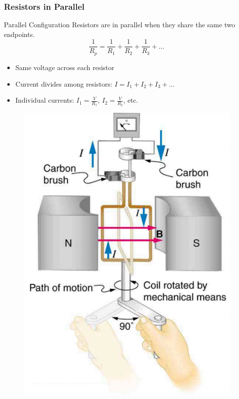 \documentclass{beamer}
\begin{document}
\begin{frame}
    \frametitle{Resistors in Parallel}
    \begin{block}{Parallel Configuration}
        Resistors are in parallel when they share the same two endpoints.
        \[ \frac{1}{R_p} = \frac{1}{R_1} + \frac{1}{R_2} + \frac{1}{R_3} + \ldots \]
    \end{block}
    \begin{itemize}
        \item Same voltage across each resistor
        \item Current divides among resistors: $I = I_1 + I_2 + I_3 + \ldots$
        \item Individual currents: $I_1 = \frac{V}{R_1}$, $I_2 = \frac{V}{R_2}$, etc.
    \end{itemize}
    \begin{center}
        \begin{figure}
            \centering
            \includegraphics[width=0.5\linewidth]{phys12-circuits-rc-circuit-diagram.png}
        \end{figure}
    \end{center}
\end{frame}
\end{document}
